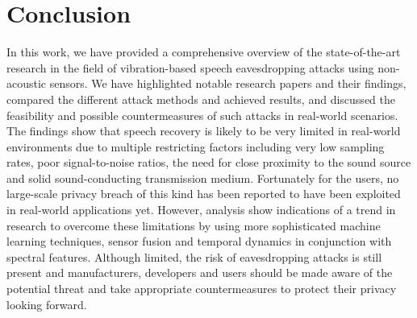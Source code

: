 \documentclass[sigconf, nonacm]{acmart}
\begin{document}
\section{Conclusion}
In this work, we have provided a comprehensive overview of the state-of-the-art research in the field of vibration-based speech eavesdropping attacks using non-acoustic sensors.
We have highlighted notable research papers and their findings, compared the different attack methods and achieved results, and discussed the feasibility and possible countermeasures of such attacks in real-world scenarios.
The findings show that speech recovery is likely to be very limited in real-world environments due to multiple restricting factors including very low sampling rates, poor signal-to-noise ratios, the need for close proximity to the sound source and solid sound-conducting transmission medium.
Fortunately for the users, no large-scale privacy breach of this kind has been reported to have been exploited in real-world applications yet.
However, analysis show indications of a trend in research to overcome these limitations by using more sophisticated machine learning techniques, sensor fusion and temporal dynamics in conjunction with spectral features.
Although limited, the risk of eavesdropping attacks is still present and manufacturers, developers and users should be made aware of the potential threat and take appropriate countermeasures to protect their privacy looking forward.






\end{document}
